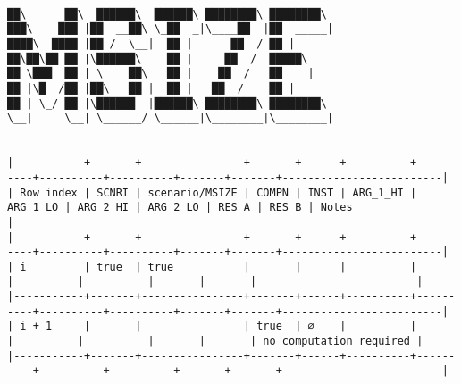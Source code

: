 \documentclass[varwidth=\maxdimen,margin=0.5cm,multi={verbatim}]{standalone}
\begin{document}
\begin{verbatim}

██\      ██\  ██████\  ██████\ ████████\ ████████\
███\    ███ |██  __██\ \_██  _|\____██  |██  _____|
████\  ████ |██ /  \__|  ██ |      ██  / ██ |
██\██\██ ██ |\██████\    ██ |     ██  /  █████\
██ \███  ██ | \____██\   ██ |    ██  /   ██  __|
██ |\█  /██ |██\   ██ |  ██ |   ██  /    ██ |
██ | \_/ ██ |\██████  |██████\ ████████\ ████████\
\__|     \__| \______/ \______|\________|\________|


|-----------+-------+----------------+-------+------+----------+----------+----------+----------+-------+-------+-------------------------|
| Row index | SCNRI | scenario/MSIZE | COMPN | INST | ARG_1_HI | ARG_1_LO | ARG_2_HI | ARG_2_LO | RES_A | RES_B | Notes                   |
|-----------+-------+----------------+-------+------+----------+----------+----------+----------+-------+-------+-------------------------|
| i         | true  | true           |       |      |          |          |          |          |       |       |                         |
|-----------+-------+----------------+-------+------+----------+----------+----------+----------+-------+-------+-------------------------|
| i + 1     |       |                | true  | ∅    |          |          |          |          |       |       | no computation required |
|-----------+-------+----------------+-------+------+----------+----------+----------+----------+-------+-------+-------------------------|

\end{verbatim}
\end{document}
